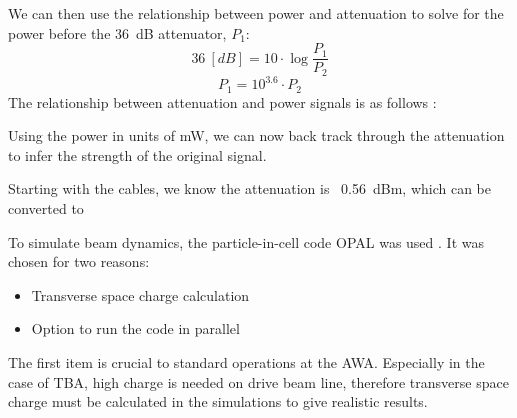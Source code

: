 \documentclass{iitthesis}
\begin{document}
We can then use the relationship between power and attenuation to solve for the 
power before the \SI{36}{dB} attenuator, $P_1$:
\begin{equation}
\SI{36}{[dB]} = 10 \cdot \log{\frac{P_{1}}{P_{2}}}
\end{equation}
\begin{equation}
P_1 = 10^{3.6} \cdot P_2 
\end{equation}
The relationship between attenuation and power signals is as follows \cite{pozar}: 


Using the power in units of mW, we can now back track through the attenuation
to infer the strength of the original signal.

Starting with the cables, we know the attenuation is ~\SI{0.56}{dBm}, which can 
be converted to \SI{}{}


\label{sec:code}
To simulate beam dynamics, the particle-in-cell code OPAL was used \cite{opal}. 
It was chosen for two reasons:
\begin{itemize}
	\item Transverse space charge calculation 
	\item Option to run the code in parallel
\end{itemize} 

The first item is crucial to standard operations at the AWA. Especially in the 
case of TBA, high charge is needed on drive beam line, therefore transverse 
space charge must be calculated in the simulations to give realistic results.
\end{document}
